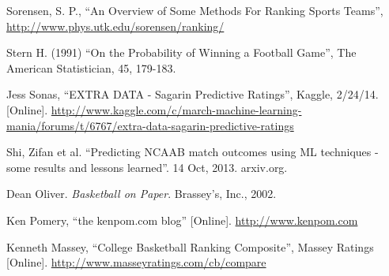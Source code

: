 \documentclass[]{article}
\begin{document}
\begin{thebibliography}{8}
	 Sorensen, S. P., ``An Overview of Some Methods For Ranking Sports Teams'', \url{http://www.phys.utk.edu/sorensen/ranking/}

	 Stern H. (1991) ``On the Probability of Winning a Football Game'', The American Statistician, 45, 179-183.

	 Jess Sonas, ``EXTRA DATA - Sagarin Predictive Ratings'', Kaggle, 2/24/14. [Online]. \url{http://www.kaggle.com/c/march-machine-learning-mania/forums/t/6767/extra-data-sagarin-predictive-ratings}

	 Shi, Zifan et al. ``Predicting NCAAB match outcomes using ML techniques - some results and lessons learned''. 14 Oct, 2013. arxiv.org.

	 Dean Oliver. \textit{Basketball on Paper}. Brassey’s, Inc., 2002.

	 Ken Pomery, ``the kenpom.com blog'' [Online]. \url{http://www.kenpom.com}

	 Kenneth Massey, ``College Basketball Ranking Composite'', Massey Ratings [Online]. \url{http://www.masseyratings.com/cb/compare}
	
\end{thebibliography}
\end{document}
